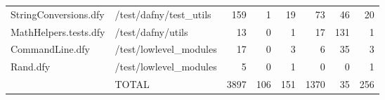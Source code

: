 \documentclass[a4paper, 12pt]{article}
\begin{document}
\begin{tabular}{llrrrrrr}
           StringConversions.dfy &                          /test/dafny/test\_utils &   159 &         1 &               19 &             73 &             46 &      20 \\
           MathHelpers.tests.dfy &                               /test/dafny/utils &    13 &         0 &                1 &             17 &            131 &       1 \\
                 CommandLine.dfy &                          /test/lowlevel\_modules &    17 &         0 &                3 &              6 &             35 &       3 \\
                        Rand.dfy &                          /test/lowlevel\_modules &     5 &         0 &                1 &              0 &              0 &       1 \\
                                 &                                           TOTAL &  3897 &       106 &              151 &           1370 &             35 &     256 \\
\bottomrule
\end{tabular}
\end{document}
